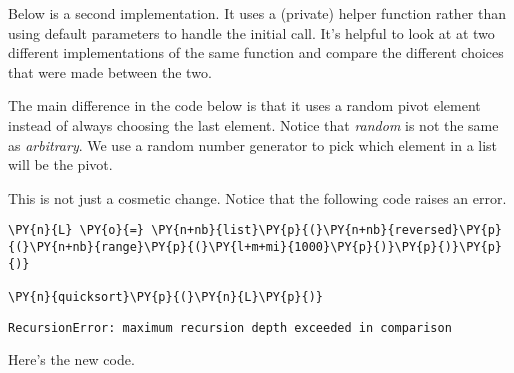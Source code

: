 \begin{Verbatim}

\end{Verbatim}


Below is a second implementation.
It uses a (private) helper function rather than using default parameters to handle the initial call.
It's helpful to look at at two different implementations of the same function and compare the different choices that were made between the two.


The main difference in the code below is that it uses a random pivot element instead of always choosing the last element.
Notice that \emph{random} is not the same as \emph{arbitrary}.
We use a random number generator to pick which element in a list will be the pivot.


This is not just a cosmetic change.
Notice that the following code raises an error.

\begin{Verbatim}[commandchars=\\\{\}]
\PY{n}{L} \PY{o}{=} \PY{n+nb}{list}\PY{p}{(}\PY{n+nb}{reversed}\PY{p}{(}\PY{n+nb}{range}\PY{p}{(}\PY{l+m+mi}{1000}\PY{p}{)}\PY{p}{)}\PY{p}{)}

\PY{n}{quicksort}\PY{p}{(}\PY{n}{L}\PY{p}{)}
\end{Verbatim}


\texttt{RecursionError: maximum recursion depth exceeded in comparison
}


Here's the new code.

